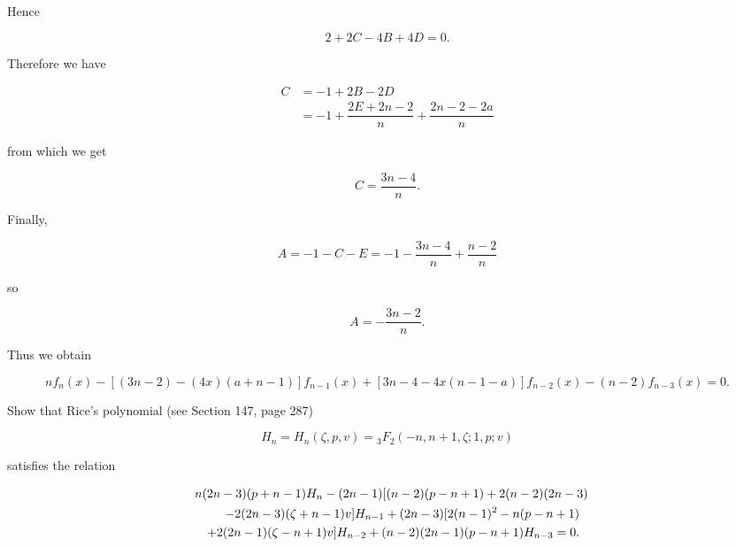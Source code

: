 \begin{solution}
Hence 

$$2+2C-4B+4D=0.$$

Therefore we have

$$\begin{array}{ll}
C &= -1 + 2B - 2D \\
&= -1 + \dfrac{2E + 2n-2}{n} + \dfrac{2n-2-2a}{n}
\end{array}$$

from which we get

$$C = \dfrac{3n-4}{n}.$$

Finally,

$$A = -1-C-E = -1 - \dfrac{3n-4}{n} + \dfrac{n-2}{n}$$

so

$$A = -\dfrac{3n-2}{n}.$$

Thus we obtain

$$nf_n(x) - [(3n-2)-(4x)(a+n-1)]f_{n-1}(x) + [3n-4-4x(n-1-a)]f_{n-2}(x) - (n-2)f_{n-3}(x)=0.$$
\end{solution}
\begin{problem}\label{problem3chapter14}
Show that Rice's polynomial (see Section 147, page 287)

$$H_n = H_n(\zeta,p,v) = {}_3F_2(-n,n+1,\zeta;1,p;v)$$

satisfies the relation

\begin{eqnarray*}
\lefteqn{n(2n-3)(p+n-1)H_n - (2n-1)[(n-2)(p-n+1)+2(n-2)(2n-3)} \\
& & -2(2n-3)(\zeta+n-1)v]H_{n-1}+(2n-3)[2(n-1)^2-n(p-n+1) \\
& & +2(2n-1)(\zeta-n+1)v]H_{n-2}+(n-2)(2n-1)(p-n+1)H_{n-3}=0.
\end{eqnarray*}
\end{problem}
